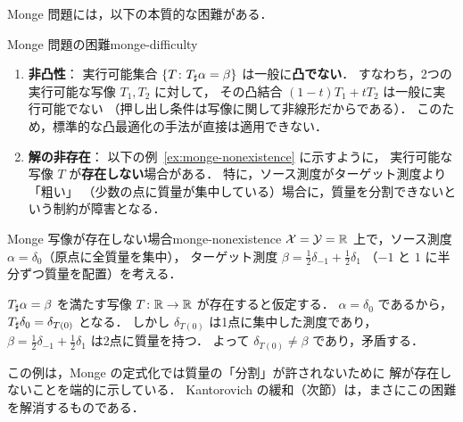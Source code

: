 Monge 問題には，以下の本質的な困難がある．

\begin{remark}{Monge 問題の困難}{monge-difficulty}
  \begin{enumerate}
    \item \textbf{非凸性}：
      実行可能集合 $\{T \colon T_\sharp \alpha = \beta\}$ は一般に\textbf{凸でない}．
      すなわち，2つの実行可能な写像 $T_1, T_2$ に対して，
      その凸結合 $(1-t)T_1 + tT_2$ は一般に実行可能でない
      （押し出し条件は写像に関して非線形だからである）．
      このため，標準的な凸最適化の手法が直接は適用できない．

    \item \textbf{解の非存在}：
      以下の例~\ref{ex:monge-nonexistence} に示すように，
      実行可能な写像 $T$ が\textbf{存在しない}場合がある．
      特に，ソース測度がターゲット測度より「粗い」
      （少数の点に質量が集中している）場合に，質量を分割できないという制約が障害となる．
  \end{enumerate}
\end{remark}

\begin{example}{Monge 写像が存在しない場合}{monge-nonexistence}
  $\mathcal{X} = \mathcal{Y} = \mathbb{R}$ 上で，ソース測度 $\alpha = \delta_0$（原点に全質量を集中），
  ターゲット測度 $\beta = \frac{1}{2}\delta_{-1} + \frac{1}{2}\delta_1$
  （$-1$ と $1$ に半分ずつ質量を配置）を考える．

  $T_\sharp \alpha = \beta$ を満たす写像 $T \colon \mathbb{R} \to \mathbb{R}$ が存在すると仮定する．
  $\alpha = \delta_0$ であるから，
  $T_\sharp \delta_0 = \delta_{T(0)}$ となる．
  しかし $\delta_{T(0)}$ は1点に集中した測度であり，
  $\beta = \frac{1}{2}\delta_{-1} + \frac{1}{2}\delta_1$ は2点に質量を持つ．
  よって $\delta_{T(0)} \neq \beta$ であり，矛盾する．

  \begin{center}
  \end{center}

  この例は，Monge の定式化では質量の「分割」が許されないために
  解が存在しないことを端的に示している．
  Kantorovich の緩和（次節）は，まさにこの困難を解消するものである．
\end{example}

